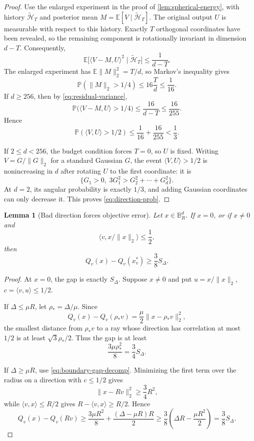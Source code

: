 \documentclass[11pt]{article}
\newcommand{\E}{\mathbb{E}}
\newcommand{\Pp}{\mathbb{P}}
\newcommand{\B}{\mathbb{B}}
\newcommand{\inner}[2]{\langle #1,#2\rangle}
\newcommand{\norm}[1]{\lVert #1\rVert_2}
\theoremstyle{plain}
\newtheorem{lemma}[lemma]{Lemma}
\theoremstyle{definition}
\begin{document}
\begin{proof}
Use the enlarged experiment in the proof of
\cref{lem:spherical-energy}, with history
$\widetilde{\mathcal H}_T$ and posterior mean
$M=\E[V\mid\widetilde{\mathcal H}_T]$. The original output $U$
is measurable with respect to this history. Exactly $T$ orthogonal
coordinates have been revealed, so the remaining component is
rotationally invariant in dimension $d-T$. Consequently,
\begin{equation}\label{eq:residual-variance}
  \E\bigl[\inner{V-M}{U}^2\mid\widetilde{\mathcal H}_T\bigr]
  \le\frac{1}{d-T}.
\end{equation}
The enlarged experiment has $\E\norm{M}^2=T/d$, so Markov's inequality gives
\[
  \Pp(\norm{M}>1/4)\le16\frac{T}{d}\le\frac1{16}.
\]
If $d\ge256$, then by \eqref{eq:residual-variance},
\[
  \Pp\bigl(\inner{V-M}{U}>1/4\bigr)
  \le\frac{16}{d-T}\le\frac{16}{255}.
\]
Hence
\[
  \Pp(\inner{V}{U}>1/2)
  \le\frac1{16}+\frac{16}{255}<\frac13.
\]

If $2\le d<256$, the budget condition forces $T=0$, so $U$ is fixed.  Writing $V=G/\norm{G}$ for a standard Gaussian $G$, the event $\inner{V}{U}>1/2$ is nonincreasing in $d$ after rotating $U$ to the first coordinate: it is
\[
  \{G_1>0,\;3G_1^2>G_2^2+\cdots+G_d^2\}.
\]
At $d=2$, its angular probability is exactly $1/3$, and adding Gaussian coordinates can only decrease it.  This proves \eqref{eq:direction-prob}.
\end{proof}

\begin{lemma}[Bad direction forces objective error]\label{lem:spherical-gap}
Let $x\in\B_R^d$.  If $x=0$, or if $x\ne0$ and
\[
  \inner{v}{x/\norm{x}}\le\frac12,
\]
then
\begin{equation}\label{eq:spherical-gap}
  Q_v(x)-Q_v(x_v^*)\ge\frac38 S_\Delta.
\end{equation}
\end{lemma}

\begin{proof}
At $x=0$, the gap is exactly $S_\Delta$.  Suppose $x\ne0$ and put $u=x/\norm{x}$, $c=\inner{v}{u}\le1/2$.

If $\Delta\le\mu R$, let $\rho_*=\Delta/\mu$.  Since
\[
   Q_v(x)-Q_v(\rho_*v)=\frac{\mu}{2}\norm{x-\rho_*v}^2,
\]
the smallest distance from $\rho_*v$ to a ray whose direction has correlation at most $1/2$ is at least $\sqrt{3}\rho_*/2$.  Thus the gap is at least
\[
   \frac{3\mu\rho_*^2}{8}=\frac34S_\Delta.
\]

If $\Delta\ge\mu R$, use \eqref{eq:boundary-gap-decomp}.  Minimizing the first term over the radius on a direction with $c\le1/2$ gives
\[
   \norm{x-Rv}^2\ge\frac34R^2,
\]
while $\inner{v}{x}\le R/2$ gives $R-\inner{v}{x}\ge R/2$.  Hence
\[
  Q_v(x)-Q_v(Rv)
  \ge \frac{3\mu R^2}{8}+\frac{(\Delta-\mu R)R}{2}
  \ge\frac38\left(\Delta R-\frac{\mu R^2}{2}\right)
  =\frac38S_\Delta.
\]
\end{proof}
\end{document}
